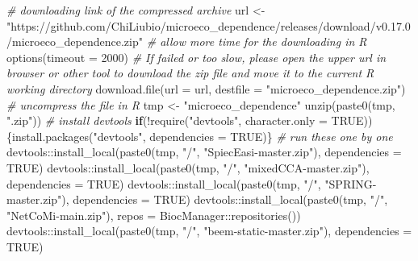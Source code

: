 \documentclass[
]{book}
\newenvironment{Shaded}{\begin{snugshade}}{\end{snugshade}}
\newcommand{\AttributeTok}[1]{\textcolor[rgb]{0.77,0.63,0.00}{#1}}
\newcommand{\CommentTok}[1]{\textcolor[rgb]{0.56,0.35,0.01}{\textit{#1}}}
\newcommand{\ConstantTok}[1]{\textcolor[rgb]{0.00,0.00,0.00}{#1}}
\newcommand{\ControlFlowTok}[1]{\textcolor[rgb]{0.13,0.29,0.53}{\textbf{#1}}}
\newcommand{\DecValTok}[1]{\textcolor[rgb]{0.00,0.00,0.81}{#1}}
\newcommand{\FunctionTok}[1]{\textcolor[rgb]{0.00,0.00,0.00}{#1}}
\newcommand{\NormalTok}[1]{#1}
\newcommand{\OtherTok}[1]{\textcolor[rgb]{0.56,0.35,0.01}{#1}}
\newcommand{\SpecialCharTok}[1]{\textcolor[rgb]{0.00,0.00,0.00}{#1}}
\newcommand{\StringTok}[1]{\textcolor[rgb]{0.31,0.60,0.02}{#1}}
\begin{document}
\begin{Shaded}
\begin{Highlighting}[]
\CommentTok{\# downloading link of the compressed archive}
\NormalTok{url }\OtherTok{\textless{}{-}} \StringTok{"https://github.com/ChiLiubio/microeco\_dependence/releases/download/v0.17.0/microeco\_dependence.zip"}
\CommentTok{\# allow more time for the downloading in R}
\FunctionTok{options}\NormalTok{(}\AttributeTok{timeout =} \DecValTok{2000}\NormalTok{)}
\CommentTok{\# If failed or too slow, please open the upper url in browser or other tool to download the zip file and move it to the current R working directory}
\FunctionTok{download.file}\NormalTok{(}\AttributeTok{url =}\NormalTok{ url, }\AttributeTok{destfile =} \StringTok{"microeco\_dependence.zip"}\NormalTok{)}
\CommentTok{\# uncompress the file in R}
\NormalTok{tmp }\OtherTok{\textless{}{-}} \StringTok{"microeco\_dependence"}
\FunctionTok{unzip}\NormalTok{(}\FunctionTok{paste0}\NormalTok{(tmp, }\StringTok{".zip"}\NormalTok{))}
\CommentTok{\# install devtools}
\ControlFlowTok{if}\NormalTok{(}\SpecialCharTok{!}\FunctionTok{require}\NormalTok{(}\StringTok{"devtools"}\NormalTok{, }\AttributeTok{character.only =} \ConstantTok{TRUE}\NormalTok{))\{}\FunctionTok{install.packages}\NormalTok{(}\StringTok{"devtools"}\NormalTok{, }\AttributeTok{dependencies =} \ConstantTok{TRUE}\NormalTok{)\}}
\CommentTok{\# run these one by one}
\NormalTok{devtools}\SpecialCharTok{::}\FunctionTok{install\_local}\NormalTok{(}\FunctionTok{paste0}\NormalTok{(tmp, }\StringTok{"/"}\NormalTok{, }\StringTok{"SpiecEasi{-}master.zip"}\NormalTok{), }\AttributeTok{dependencies =} \ConstantTok{TRUE}\NormalTok{)}
\NormalTok{devtools}\SpecialCharTok{::}\FunctionTok{install\_local}\NormalTok{(}\FunctionTok{paste0}\NormalTok{(tmp, }\StringTok{"/"}\NormalTok{, }\StringTok{"mixedCCA{-}master.zip"}\NormalTok{), }\AttributeTok{dependencies =} \ConstantTok{TRUE}\NormalTok{)}
\NormalTok{devtools}\SpecialCharTok{::}\FunctionTok{install\_local}\NormalTok{(}\FunctionTok{paste0}\NormalTok{(tmp, }\StringTok{"/"}\NormalTok{, }\StringTok{"SPRING{-}master.zip"}\NormalTok{), }\AttributeTok{dependencies =} \ConstantTok{TRUE}\NormalTok{)}
\NormalTok{devtools}\SpecialCharTok{::}\FunctionTok{install\_local}\NormalTok{(}\FunctionTok{paste0}\NormalTok{(tmp, }\StringTok{"/"}\NormalTok{, }\StringTok{"NetCoMi{-}main.zip"}\NormalTok{), }\AttributeTok{repos =}\NormalTok{ BiocManager}\SpecialCharTok{::}\FunctionTok{repositories}\NormalTok{())}
\NormalTok{devtools}\SpecialCharTok{::}\FunctionTok{install\_local}\NormalTok{(}\FunctionTok{paste0}\NormalTok{(tmp, }\StringTok{"/"}\NormalTok{, }\StringTok{"beem{-}static{-}master.zip"}\NormalTok{), }\AttributeTok{dependencies =} \ConstantTok{TRUE}\NormalTok{)}

\end{Highlighting}
\end{Shaded}
\end{document}
